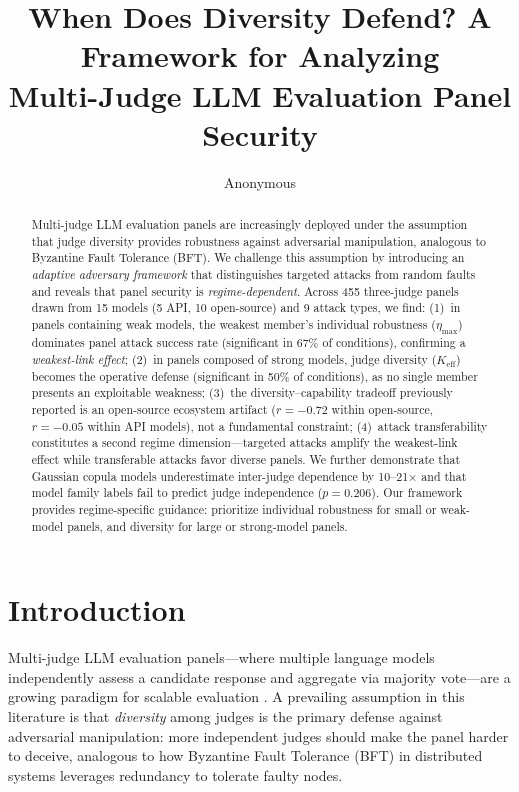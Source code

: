 \documentclass[11pt]{article}
\title{When Does Diversity Defend? A Framework for Analyzing\\Multi-Judge LLM Evaluation Panel Security}
\author{Anonymous}
\begin{document}
\maketitle

\begin{abstract}
Multi-judge LLM evaluation panels are increasingly deployed under the assumption that judge diversity provides robustness against adversarial manipulation, analogous to Byzantine Fault Tolerance (BFT).
We challenge this assumption by introducing an \emph{adaptive adversary framework} that distinguishes targeted attacks from random faults and reveals that panel security is \emph{regime-dependent}.
Across 455 three-judge panels drawn from 15 models (5 API, 10 open-source) and 9 attack types, we find:
(1)~in panels containing weak models, the weakest member's individual robustness ($\eta_{\max}$) dominates panel attack success rate (significant in 67\% of conditions), confirming a \emph{weakest-link effect};
(2)~in panels composed of strong models, judge diversity ($K_{\text{eff}}$) becomes the operative defense (significant in 50\% of conditions), as no single member presents an exploitable weakness;
(3)~the diversity--capability tradeoff previously reported is an open-source ecosystem artifact ($r=-0.72$ within open-source, $r=-0.05$ within API models), not a fundamental constraint;
(4)~attack transferability constitutes a second regime dimension---targeted attacks amplify the weakest-link effect while transferable attacks favor diverse panels.
We further demonstrate that Gaussian copula models underestimate inter-judge dependence by 10--21$\times$ and that model family labels fail to predict judge independence ($p=0.206$).
Our framework provides regime-specific guidance: prioritize individual robustness for small or weak-model panels, and diversity for large or strong-model panels.
\end{abstract}

\section{Introduction}

Multi-judge LLM evaluation panels---where multiple language models independently assess a candidate response and aggregate via majority vote---are a growing paradigm for scalable evaluation \cite{zheng2024judging}.
A prevailing assumption in this literature is that \emph{diversity} among judges is the primary defense against adversarial manipulation: more independent judges should make the panel harder to deceive, analogous to how Byzantine Fault Tolerance (BFT) in distributed systems leverages redundancy to tolerate faulty nodes.
\end{document}
